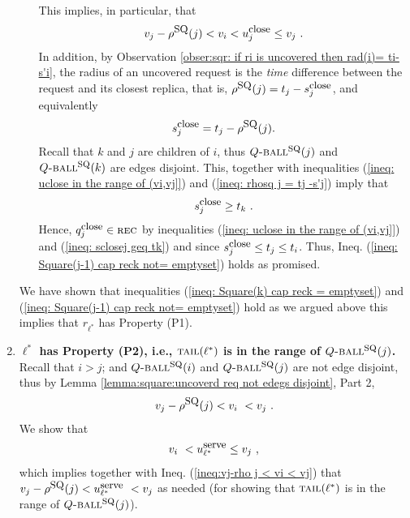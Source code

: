 \documentclass[11pt]{article}
\newcommand{\rr}{r}
\newcommand{\uSQ}{u^{\mbox{\small\upshape serve}}}
\newcommand{\qclose}{q^{\mbox{\small\upshape close}}}
\newcommand{\uclose}{u^{\mbox{\small\upshape close}}}
\newcommand{\sclose}{s^{\mbox{\small\upshape close}}}
\newcommand{\tail}[0]{\mbox{\sc tail}}
\newcommand{\rhoSQ}[0]{\rho^{\mbox{\small\upshape SQ}}}
\newcommand{\reck}[0]{\mbox{\sc rec}}
\newcommand{\SQball}[0]{Q{\mbox{\sc -ball}}^{\mbox{\sc sq}}}
\begin{document}
\begin{enumerate}
\begin{enumerate}
This implies, in particular, that
\begin{eqnarray}
v_j-\rhoSQ(j)<v_i<\uclose_j\leq v_j~.
\label{ineq: uclose in the range of (vi,vj]}
\end{eqnarray}
In addition,
by Observation \ref{obser:sqr: if ri is uncovered then rad(i)= ti-s'i},
the radius of an uncovered request is the {\em time} difference between the request and its closest replica, that is,
$\rhoSQ(j)=t_j-\sclose_j$, and equivalently
\begin{eqnarray}
\label{ineq: rhosq j = tj -s'j}
 \sclose_j=t_j-\rhoSQ(j).
\end{eqnarray}
Recall that $k$ and $j$ are children of $i$, thus $\SQball(j)$ and $\SQball(k)$ are edges disjoint.
This, together with inequalities (\ref{ineq: uclose in the range of (vi,vj]}) and (\ref{ineq: rhosq j = tj -s'j})
imply that
\begin{eqnarray}
\sclose_j \geq t_k~.
\label{ineq: sclosej geq tk}
\end{eqnarray}
Hence, $\qclose_j\in\reck$ by inequalities (\ref{ineq: uclose in the range of (vi,vj]}) and (\ref{ineq: sclosej geq tk}) and since $\sclose_j\leq t_j\leq t_i$.
Thus, Ineq. (\ref{ineq: Square(j-1) cap reck not= emptyset}) holds as promised.

\end{enumerate}



We have shown that inequalities (\ref{ineq: Square(k) cap reck = emptyset}) and (\ref{ineq: Square(j-1) cap reck not= emptyset}) hold
as we argued above
this implies that $\rr_{\ell^*}$ has Property (P1).











\item {\bf $\ell^*$ has Property (P2), i.e., $\tail(\ell^*)$ is in the range of $\SQball(j)$.}
Recall that $i>j$; and $\SQball(i)$ and $\SQball(j)$ are not edge disjoint, thus by Lemma \ref{lemma:square:uncoverd req not edegs disjoint}, Part 2,
\begin{eqnarray}
\label{ineq:vj-rho j < vi < vj}
v_j-\rhoSQ(j) < v_i~ < v_j~.
\end{eqnarray}
We show
that
\begin{eqnarray}
\label{ineq:vi < uSQell vi < vj}
v_i~ < \uSQ_{\ell^*} \leq v_j~,
\end{eqnarray}
which implies together with Ineq. (\ref{ineq:vj-rho j < vi < vj}) that
$v_j-\rhoSQ(j) < \uSQ_{\ell^*}~ < v_j
$ as needed (for showing that $\tail(\ell^*)$ is in the range of $\SQball(j)$).


\end{enumerate}
\end{document}
